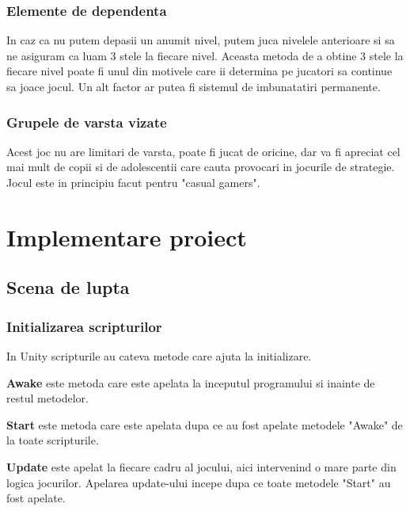 \documentclass[12pt, a4paper]{article}
\begin{document}
	
	
	\subsubsection{Elemente de dependenta}
	
	In caz ca nu putem depasii un anumit nivel, putem juca nivelele anterioare si sa ne asiguram ca luam 3 stele la fiecare nivel. Aceasta metoda de a obtine 3 stele la fiecare nivel poate fi unul din motivele care ii determina pe jucatori sa continue sa joace jocul. Un alt factor ar putea fi sistemul de imbunatatiri permanente.
	
	
	
	\subsubsection{Grupele de varsta vizate}
	
	Acest joc nu are limitari de varsta, poate fi jucat de oricine, dar va fi apreciat cel mai mult de copii si de adolescentii care cauta provocari in jocurile de strategie. Jocul este in principiu facut pentru "casual gamers".
	
	
	
	\section{Implementare proiect}
	
	\subsection{Scena de lupta}
	
	\subsubsection{Initializarea scripturilor}
	\label{section: initialization}
	
	In Unity scripturile au cateva metode care ajuta la initializare.
	
	\textbf{Awake} este metoda care este apelata la inceputul programului si inainte de restul metodelor.
	
	\textbf{Start} este metoda care este apelata dupa ce au fost apelate metodele "Awake" de la toate scripturile.
	
	\textbf{Update} este apelat la fiecare cadru al jocului, aici intervenind o mare parte din logica jocurilor. Apelarea update-ului incepe dupa ce toate metodele "Start" au fost apelate.
	
\end{document}
